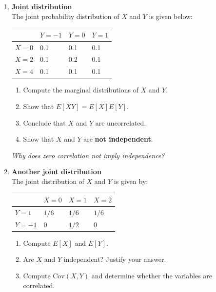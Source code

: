 \documentclass[
  letterpaper,
  DIV=11,
  numbers=noendperiod]{scrreprt}
\providecommand{\tightlist}{%
  \setlength{\itemsep}{0pt}\setlength{\parskip}{0pt}}
\begin{document}
\begin{enumerate}
\def\labelenumi{\arabic{enumi}.}
\setcounter{enumi}{4}
\item
  \textbf{Joint distribution}\\
  The joint probability distribution of \(X\) and \(Y\) is given below:

  \begin{longtable}[]{@{}llll@{}}
  \toprule\noalign{}
  & \(Y=-1\) & \(Y=0\) & \(Y=1\) \\
  \midrule\noalign{}
  \endhead
  \bottomrule\noalign{}
  \endlastfoot
  \(X=0\) & 0.1 & 0.1 & 0.1 \\
  \(X=2\) & 0.1 & 0.2 & 0.1 \\
  \(X=4\) & 0.1 & 0.1 & 0.1 \\
  \end{longtable}

  \begin{enumerate}
  \def\labelenumii{(\alph{enumii})}
  \tightlist
  \item
    Compute the marginal distributions of \(X\) and \(Y\).\\
  \item
    Show that \(E[XY] = E[X]E[Y]\).\\
  \item
    Conclude that \(X\) and \(Y\) are uncorrelated.\\
  \item
    Show that \(X\) and \(Y\) are \textbf{not independent}.
  \end{enumerate}

  \emph{Why does zero correlation not imply independence?}
\item
  \textbf{Another joint distribution}\\
  The joint distribution of \(X\) and \(Y\) is given by:

  \begin{longtable}[]{@{}llll@{}}
  \toprule\noalign{}
  & \(X=0\) & \(X=1\) & \(X=2\) \\
  \midrule\noalign{}
  \endhead
  \bottomrule\noalign{}
  \endlastfoot
  \(Y=1\) & \(1/6\) & \(1/6\) & \(1/6\) \\
  \(Y=-1\) & 0 & \(1/2\) & 0 \\
  \end{longtable}

  \begin{enumerate}
  \def\labelenumii{(\alph{enumii})}
  \tightlist
  \item
    Compute \(E[X]\) and \(E[Y]\).\\
  \item
    Are \(X\) and \(Y\) independent? Justify your answer.\\
  \item
    Compute \(\text{Cov}(X,Y)\) and determine whether the variables are
    correlated.
  \end{enumerate}
\end{enumerate}
\end{document}
